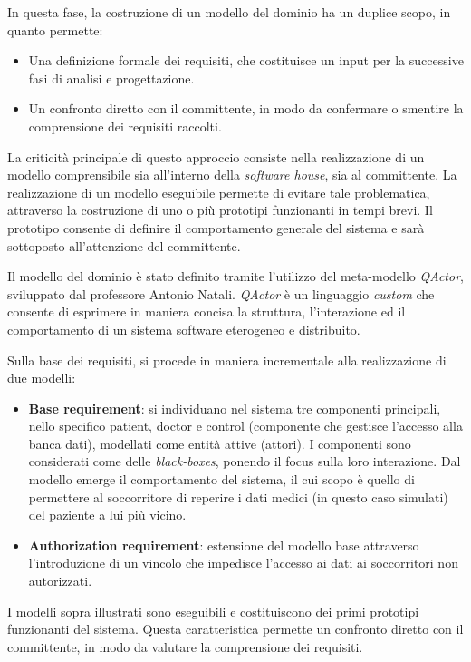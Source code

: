 \documentclass[a4paper,12pt]{report}
\begin{document}
In questa fase, la costruzione di un modello del dominio ha un duplice scopo, in quanto permette:
\begin{itemize}
	\item Una definizione formale dei requisiti, che costituisce un input per la successive fasi di analisi e progettazione.
	\item Un confronto diretto con il committente, in modo da confermare o smentire la comprensione dei requisiti raccolti. 
\end{itemize}

La criticità principale di questo approccio consiste nella realizzazione di un modello comprensibile sia all'interno della \emph{software house}, sia al committente. La realizzazione di un modello eseguibile permette di evitare tale problematica, attraverso la costruzione di uno o più prototipi funzionanti in tempi brevi. Il prototipo consente di definire il comportamento generale del sistema e sarà sottoposto all'attenzione del committente. 

Il modello del dominio è stato definito tramite l'utilizzo del meta-modello \emph{QActor}, sviluppato dal professore Antonio Natali. \emph{QActor} è un linguaggio \emph{custom} che consente di esprimere in maniera concisa la struttura, l'interazione ed il comportamento di un sistema software eterogeneo e distribuito.

Sulla base dei requisiti, si procede in maniera incrementale alla realizzazione di due modelli:
\begin{itemize}
	\item \textbf{Base requirement}: si individuano nel sistema tre componenti principali, nello specifico patient, doctor e control (componente che gestisce l'accesso alla banca dati), modellati come entità attive (attori). I componenti sono considerati come delle \emph{black-boxes}, ponendo il focus sulla loro interazione. Dal modello emerge il comportamento del sistema, il cui scopo è quello di permettere al soccorritore di reperire i dati medici (in questo caso simulati) del paziente a lui più vicino.
	\item \textbf{Authorization requirement}: estensione del modello base attraverso l'introduzione di un vincolo che impedisce l'accesso ai dati ai soccorritori non autorizzati.
\end{itemize}
I modelli sopra illustrati sono eseguibili e costituiscono dei primi prototipi funzionanti del sistema. Questa caratteristica permette un confronto diretto con il committente, in modo da valutare la comprensione dei requisiti.
\end{document}
